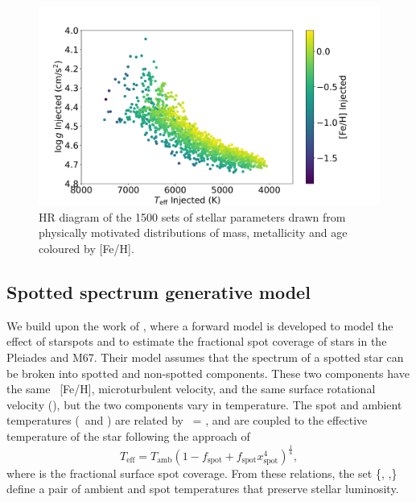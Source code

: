 \begin{figure}
    \includegraphics[width=\textwidth]{Figures/ss_chapter_figures/injected_hr.png}
    \caption[HR diagram of the 1500 sets of stellar parameters drawn from physically motivated distributions of mass{,} metallicity and age coloured by \feh.]{HR diagram of the 1500 sets of stellar parameters drawn from physically motivated distributions of mass, metallicity and age coloured by [Fe/H].}
    \label{fig:HR}
\end{figure}


\subsection{Spotted spectrum generative model}

\label{sec:gen}
We build upon the work of \citep{cao_starspots_2022}, where a forward model is developed to model the effect of starspots and to estimate the fractional spot coverage of stars in the Pleiades and M67. Their model assumes that the spectrum of a spotted star can be broken into spotted and non-spotted components. These two components have the same \logg\, [Fe/H], microturbulent velocity, and the same surface rotational velocity (\vsini), but the two components vary in temperature. The spot and ambient temperatures (\tspot\ and \tamb) are related by \tspot\  = \xspot \tamb, and are coupled to the effective temperature of the star following the approach of \citet{somers_impact_2015}
\begin{equation}
    T_{\text{eff}} = T_{\text{amb}}(1 - f_{\text{spot}} + f_{\text{spot}}x_{\text{spot}}^{4} )^{\frac{1}{4}},
    \label{eq:teff}
\end{equation}
where \fspot is the fractional surface spot coverage. From these relations, the set \{\teff, \xspot,\fspot\} define a pair of ambient and spot temperatures that preserve stellar luminosity.

